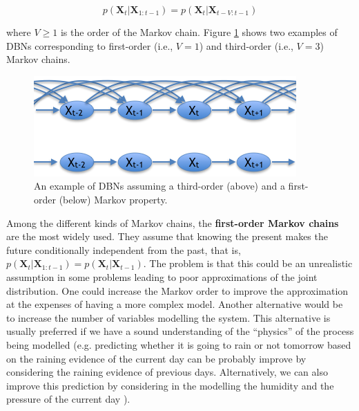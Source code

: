 $$p(\bm X_t| \bm X_{1:t-1})  = p(\bm X_t|\bm X_{t-V:t-1})$$

\noindent where $V\geq 1$ is the order of the Markov chain. Figure \ref{Figure:markovChain} shows two examples of DBNs corresponding to first-order (i.e., $V=1$) and third-order (i.e., $V=3$) Markov chains. 

\begin{figure}[ht!]
\begin{center}
\includegraphics[scale=0.56]{./figures/PreliminariesMarkovChain}
\caption{\label{Figure:markovChain} An example of DBNs assuming a third-order (above) and a first-order (below) Markov property.
}
\end{center}
\end{figure}

Among the different kinds of Markov chains, the \textbf{first-order Markov chains} are the most widely used. They assume that knowing the present makes the future conditionally independent from the past, that is, $p(\bm X_t| \bm X_{1:t-1})  = p(\bm X_t|\bm X_{t-1})$. The problem is that this could be an unrealistic assumption in some problems leading to poor approximations of the joint distribution. One could increase the Markov order to improve the approximation at the expenses of having a more complex model. Another  alternative \cite{russelNorvig2009} would be to increase the number of variables modelling the system. This alternative is usually preferred if we have a sound understanding of the ``physics''  of the process being modelled (e.g. predicting whether it is going to rain or not tomorrow based on the raining evidence of the current day can be probably improve by considering the raining evidence of previous days. Alternatively, we can also improve this prediction by considering in the modelling the humidity and the pressure of the current day \cite{russelNorvig2009}). 


